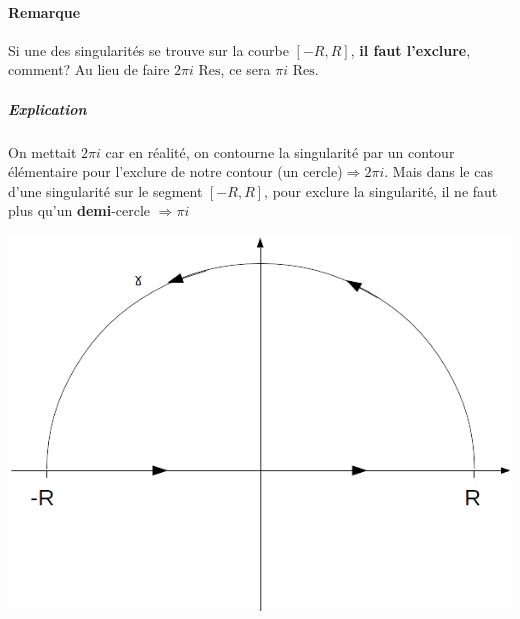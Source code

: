 \paragraph{Remarque} Si une des singularités se trouve sur la courbe $[-R,R]$, \textbf{il faut l'exclure}, comment? Au lieu de faire $2\pi i\text{ Res}$, ce sera $\pi i\text{ Res}$.\subparagraph{Explication} On mettait $2\pi i$ car en réalité, on contourne la singularité par un contour élémentaire pour l'exclure de notre contour (un cercle)$\Rightarrow 2\pi i$. Mais dans le cas d'une singularité sur le segment $[-R,R]$, pour exclure la singularité, il ne faut plus qu’un \textbf{demi}-cercle $\Rightarrow \pi i$
\begin{center}
	\includegraphics[scale=0.5]{test2}
	\label{fig::p}
\end{center}


